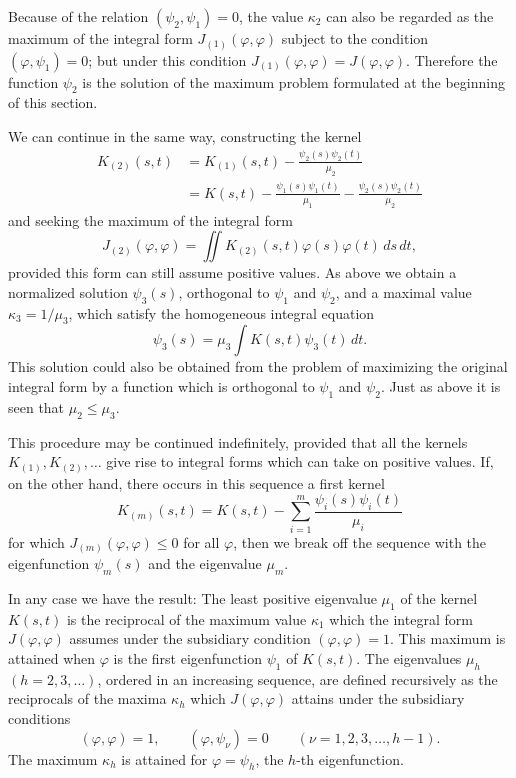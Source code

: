 Because of the relation $(\psi_2,\psi_1)=0$, the value $\kappa_2$ can also be regarded as the maximum of the integral form $J_{(1)}(\varphi,\varphi)$ subject to the condition $(\varphi,\psi_1)=0$; but under this condition $J_{(1)}(\varphi,\varphi)=J(\varphi,\varphi)$. Therefore the function $\psi_2$ is the solution of the maximum problem formulated at the beginning of this section.

We can continue in the same way, constructing the kernel
\begin{equation}\tag{41}
\begin{aligned}
K_{(2)}(s,t)
&=K_{(1)}(s,t)-\frac{\psi_2(s)\psi_2(t)}{\mu_2}\\
&=K(s,t)-\frac{\psi_1(s)\psi_1(t)}{\mu_1}-\frac{\psi_2(s)\psi_2(t)}{\mu_2}
\end{aligned}
\end{equation}
and seeking the maximum of the integral form
\begin{equation}\tag{42}
J_{(2)}(\varphi,\varphi)=\iint K_{(2)}(s,t)\varphi(s)\varphi(t)\,ds\,dt,
\end{equation}
provided this form can still assume positive values. As above we obtain a normalized solution $\psi_3(s)$, orthogonal to $\psi_1$ and $\psi_2$, and a maximal value $\kappa_3=1/\mu_3$, which satisfy the homogeneous integral equation
\[
\psi_3(s)=\mu_3\int K(s,t)\psi_3(t)\,dt.
\]
This solution could also be obtained from the problem of maximizing the original integral form by a function which is orthogonal to $\psi_1$ and $\psi_2$. Just as above it is seen that $\mu_2\le\mu_3$.

This procedure may be continued indefinitely, provided that all the kernels $K_{(1)},K_{(2)},\ldots$ give rise to integral forms which can take on positive values. If, on the other hand, there occurs in this sequence a first kernel
\begin{equation}\tag{43}
K_{(m)}(s,t)=K(s,t)-\sum_{i=1}^{m}\frac{\psi_i(s)\psi_i(t)}{\mu_i}
\end{equation}
for which $J_{(m)}(\varphi,\varphi)\le0$ for all $\varphi$, then we break off the sequence with the eigenfunction $\psi_m(s)$ and the eigenvalue $\mu_m$.

In any case we have the result: The least positive eigenvalue $\mu_1$ of the kernel $K(s,t)$ is the reciprocal of the maximum value $\kappa_1$ which the integral form $J(\varphi,\varphi)$ assumes under the subsidiary condition $(\varphi,\varphi)=1$. This maximum is attained when $\varphi$ is the first eigenfunction $\psi_1$ of $K(s,t)$. The eigenvalues $\mu_h$ $(h=2,3,\ldots)$, ordered in an increasing sequence, are defined recursively as the reciprocals of the maxima $\kappa_h$ which $J(\varphi,\varphi)$ attains under the subsidiary conditions
\[
(\varphi,\varphi)=1,
\qquad
(\varphi,\psi_\nu)=0
\qquad(\nu=1,2,3,\ldots,h-1).
\]
The maximum $\kappa_h$ is attained for $\varphi=\psi_h$, the $h$-th eigenfunction.

